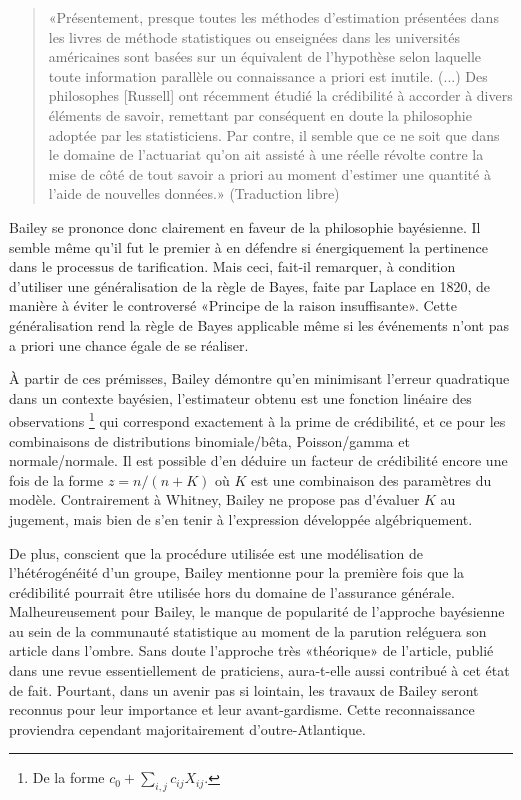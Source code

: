 \begin{quote}
  «Présentement, presque toutes les méthodes d'estimation présentées
  dans les livres de méthode statistiques ou enseignées dans les
  universités américaines sont basées sur un équivalent de l'hypothèse
  selon laquelle toute information parallèle ou connaissance a priori
  est inutile. (...) Des philosophes [Russell] ont récemment étudié la
  crédibilité à accorder à divers éléments de savoir, remettant par
  conséquent en doute la philosophie adoptée par les statisticiens.
  Par contre, il semble que ce ne soit que dans le domaine de
  l'actuariat qu'on ait assisté à une réelle révolte contre la mise de
  côté de tout savoir a priori au moment d'estimer une quantité à
  l'aide de nouvelles données.» (Traduction libre)
\end{quote}

Bailey se prononce donc clairement en faveur de la philosophie
bayésienne. Il semble même qu'il fut le premier à en défendre si
énergiquement la pertinence dans le processus de tarification. Mais
ceci, fait-il remarquer, à condition d'utiliser une généralisation de
la règle de Bayes, faite par Laplace en 1820, de manière à éviter le
controversé «Principe de la raison insuffisante». Cette généralisation
rend la règle de Bayes applicable même si les événements n'ont pas a
priori une chance égale de se réaliser.

À partir de ces prémisses, Bailey démontre qu'en minimisant l'erreur
quadratique dans un contexte bayésien, l'estimateur obtenu est une
fonction linéaire des observations%
\footnote{De la forme $c_0 + \sum_{i,j} c_{ij} X_{ij}$.} %
qui correspond exactement à la prime de crédibilité, et ce pour les
combinaisons de distributions binomiale/bêta, Poisson/gamma et
normale/normale. Il est possible d'en déduire un facteur de
crédibilité encore une fois de la forme $z = n/(n + K)$ où $K$ est une
combinaison des paramètres du modèle.  Contrairement à Whitney, Bailey
ne propose pas d'évaluer $K$ au jugement, mais bien de s'en tenir à
l'expression développée algébriquement.

De plus, conscient que la procédure utilisée est une modélisation de
l'hétérogénéité d'un groupe, Bailey mentionne pour la première fois
que la crédibilité pourrait être utilisée hors du domaine de
l'assurance générale. Malheureusement pour Bailey, le manque de
popularité de l'approche bayésienne au sein de la communauté
statistique au moment de la parution reléguera son article dans
l'ombre. Sans doute l'approche très «théorique» de l'article, publié
dans une revue essentiellement de praticiens, aura-t-elle aussi
contribué à cet état de fait. Pourtant, dans un avenir pas si
lointain, les travaux de Bailey seront reconnus pour leur importance
et leur avant-gardisme. Cette reconnaissance proviendra cependant
majoritairement d'outre-Atlantique.

